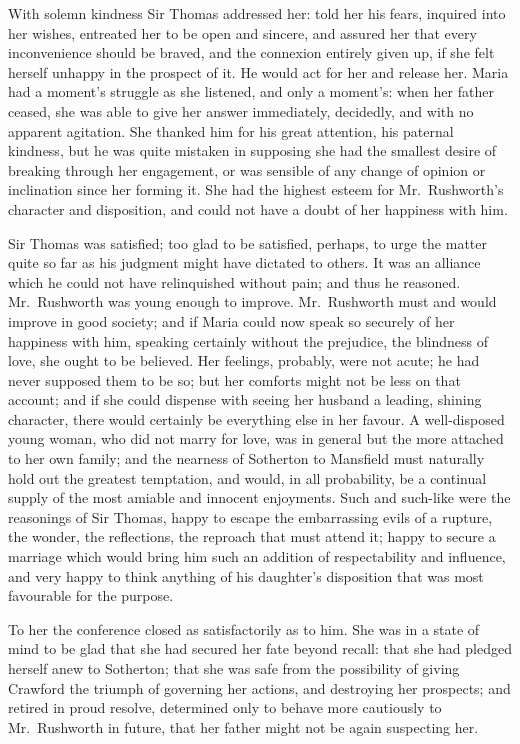 With solemn kindness Sir Thomas addressed her:  told her
his fears, inquired into her wishes, entreated her to be
open and sincere, and assured her that every inconvenience
should be braved, and the connexion entirely given up,
if she felt herself unhappy in the prospect of it.
He would act for her and release her.  Maria had a moment's
struggle as she listened, and only a moment's: when her
father ceased, she was able to give her answer immediately,
decidedly, and with no apparent agitation.  She thanked
him for his great attention, his paternal kindness, but he
was quite mistaken in supposing she had the smallest desire
of breaking through her engagement, or was sensible of any
change of opinion or inclination since her forming it.
She had the highest esteem for Mr.\ Rushworth's character
and disposition, and could not have a doubt of her happiness with
him.

Sir Thomas was satisfied; too glad to be satisfied,
perhaps, to urge the matter quite so far as his judgment
might have dictated to others.  It was an alliance which
he could not have relinquished without pain; and thus
he reasoned.  Mr.\ Rushworth was young enough to improve.
Mr.\ Rushworth must and would improve in good society;
and if Maria could now speak so securely of her happiness
with him, speaking certainly without the prejudice,
the blindness of love, she ought to be believed.
Her feelings, probably, were not acute; he had never
supposed them to be so; but her comforts might not
be less on that account; and if she could dispense
with seeing her husband a leading, shining character,
there would certainly be everything else in her favour.
A well-disposed young woman, who did not marry for love,
was in general but the more attached to her own family;
and the nearness of Sotherton to Mansfield must naturally hold
out the greatest temptation, and would, in all probability,
be a continual supply of the most amiable and innocent enjoyments.
Such and such-like were the reasonings of Sir Thomas,
happy to escape the embarrassing evils of a rupture,
the wonder, the reflections, the reproach that must
attend it; happy to secure a marriage which would bring
him such an addition of respectability and influence,
and very happy to think anything of his daughter's
disposition that was most favourable for the purpose.

To her the conference closed as satisfactorily as to him.
She was in a state of mind to be glad that she had secured
her fate beyond recall:  that she had pledged herself
anew to Sotherton; that she was safe from the possibility
of giving Crawford the triumph of governing her actions,
and destroying her prospects; and retired in proud resolve,
determined only to behave more cautiously to Mr.\ Rushworth
in future, that her father might not be again suspecting her.

